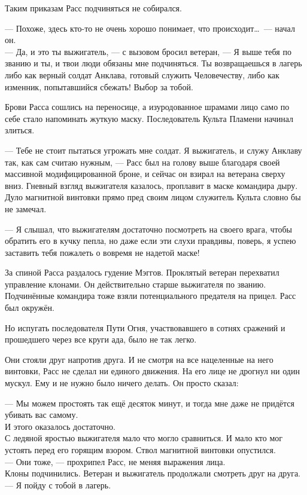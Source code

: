 Таким приказам Расс подчиняться не собирался.

\noindent --- Похоже, здесь кто-то не очень хорошо понимает, что 
происходит\ldots\ --- начал он.\\
--- Да, и это ты выжигатель, --- с вызовом бросил ветеран, --- Я выше тебя по 
званию и ты, и твои люди обязаны мне подчиняться. Ты возвращаешься в лагерь 
либо как верный солдат Анклава, готовый служить Человечеству, либо как 
изменник, попытавшийся сбежать! Выбор за тобой.

Брови Расса сошлись на переносице, а изуродованное шрамами лицо само по себе 
стало напоминать жуткую маску. Последователь Культа Пламени начинал злиться.

\noindent --- Тебе не стоит пытаться угрожать мне солдат. Я выжигатель, и служу 
Анклаву так, как сам считаю нужным, --- Расс был на голову выше благодаря своей 
массивной модифицированной броне, и сейчас он взирал на ветерана сверху вниз. 
Гневный взгляд выжигателя казалось, проплавит в маске командира дыру. Дуло 
магнитной винтовки прямо пред своим лицом служитель Культа словно бы не замечал.

\noindent --- Я слышал, что выжигателям достаточно посмотреть на своего врага, 
чтобы обратить его в кучку пепла, но даже если эти слухи правдивы, поверь, я 
успею заставить тебя пожалеть о вовремя не надетой маске!

За спиной Расса раздалось гудение Мэггов. Проклятый ветеран перехватил 
управление клонами. Он действительно старше выжигателя по званию. Подчинённые 
командира тоже взяли потенциального предателя на прицел. Расс был окружён.

Но испугать последователя Пути Огня, участвовавшего в сотнях сражений и 
прошедшего через все круги ада, было не так легко.

Они стояли друг напротив друга. И не смотря на все нацеленные на него винтовки, 
Расс не сделал ни единого движения. На его лице не дрогнул ни один мускул. Ему и 
не нужно было ничего делать. Он просто сказал:

\noindent --- Мы можем простоять так ещё десяток минут, и тогда мне даже не 
придётся убивать вас самому.\\
И этого оказалось достаточно.\\
С ледяной яростью выжигателя мало что могло сравниться. И мало кто мог 
устоять перед его горящим взором. Ствол магнитной винтовки опустился.\\
--- Они тоже, --- прохрипел Расс, не меняя выражения лица.\\
Клоны подчинились. Ветеран и выжигатель продолжали смотреть друг на друга.\\
--- Я пойду с тобой в лагерь.

